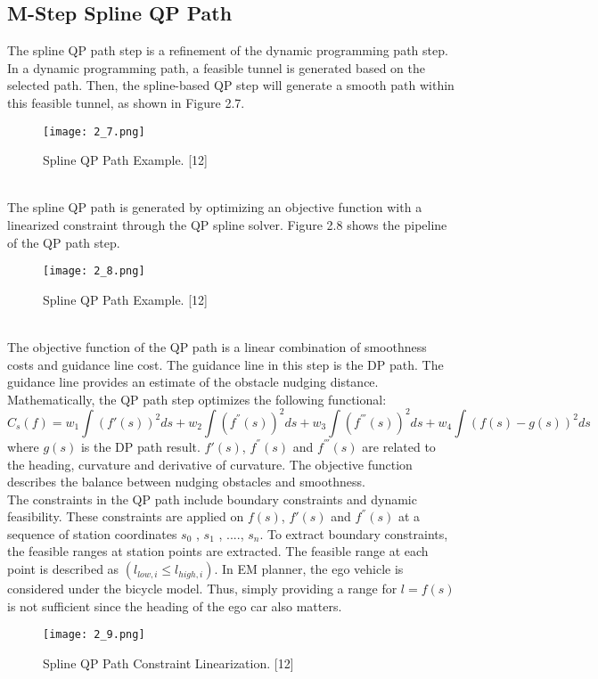 \documentclass{report}
\begin{document}
\subsection{M-Step Spline QP Path}
The spline QP path step is a refinement of the dynamic programming path step. In a dynamic programming path, a feasible tunnel is generated based on the selected path. Then, the spline-based QP step will generate a smooth path within this feasible tunnel, as shown in Figure 2.7.
   \begin{figure}[ht]
	\centering
	\texttt{[image: 2\_7.png]}
	\caption{Spline QP Path Example. [12]}
	\label{fig:2.7} 
\end{figure}\\
\indent
The spline QP path is generated by optimizing an objective function with a linearized constraint through the QP spline solver. Figure 2.8 shows the pipeline of the QP path step.
   \begin{figure}[ht]
	\centering
	\texttt{[image: 2\_8.png]}
	\caption{Spline QP Path Example. [12]}
	\label{fig:2.8} 
\end{figure}\\
\indent
The objective function of the QP path is a linear combination of smoothness costs and guidance line cost. The guidance line in this step is the DP path. The guidance line provides an estimate of the obstacle nudging distance. Mathematically, the QP path step optimizes the following functional:
\begin{equation}
C_{s}(f) = w_1 \int (f'(s))^2 ds + w_2 \int (f^{''}(s))^2 ds + w_3 \int (f^{'''}(s))^2 ds + w_4 \int (f(s) - g(s))^2 ds
\end{equation}
where $g(s)$ is the DP path result. $f'(s)$, $f^{''}(s)$ and $f^{'''}(s)$ are related to the heading, curvature and derivative of curvature. The objective function describes the balance between nudging obstacles and smoothness.\\
\indent
The constraints in the QP path include boundary constraints and dynamic feasibility. These constraints are applied on $f(s)$, $f'(s)$ and $f^{''}(s)$ at a sequence of station coordinates $s_0$ , $s_1$ , ...., $s_n$. To extract boundary constraints, the feasible ranges at station points are extracted. The feasible range at each point is described as $(l_{low,i} \leq l_{high,i} )$. In EM planner, the ego vehicle is considered under the bicycle model. Thus, simply providing a range for $l = f(s)$ is not sufficient since the heading of the ego car also matters.
  \begin{figure}[ht]
	\centering
	\texttt{[image: 2\_9.png]}
	\caption{Spline QP Path Constraint Linearization. [12]}
	\label{fig:2.9} 
\end{figure}\\
\end{document}
